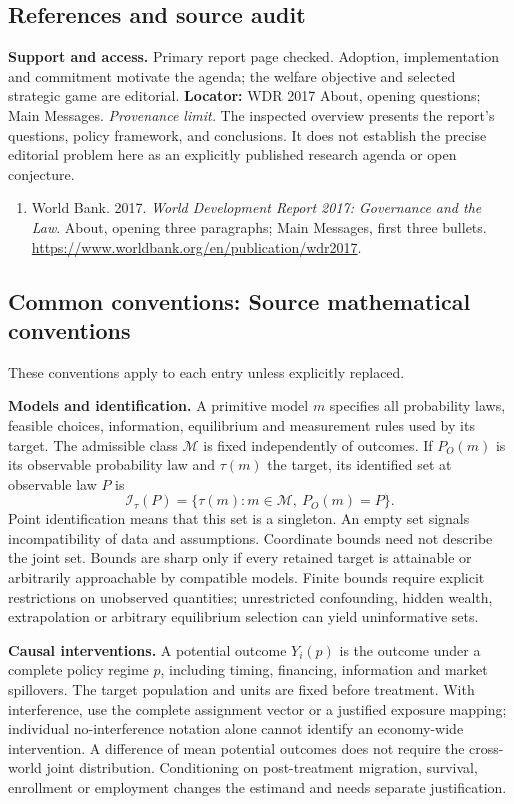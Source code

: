 \documentclass[11pt,a4paper]{article}
\begin{document}
\subsection*{References and source audit}
\textbf{Support and access.} Primary report page checked. Adoption, implementation and commitment motivate the agenda; the welfare objective and selected strategic game are editorial. \textbf{Locator:} WDR 2017 About, opening questions; Main Messages. \emph{Provenance limit.} The inspected overview presents the report's questions, policy framework, and conclusions. It does not establish the precise editorial problem here as an explicitly published research agenda or open conjecture.
\begin{enumerate}\raggedright
\item\hypertarget{definitions:source:30007671:1}{} World Bank. 2017. \emph{World Development Report 2017: Governance and the Law}. About, opening three paragraphs; Main Messages, first three bullets.
\url{https://www.worldbank.org/en/publication/wdr2017}.
\end{enumerate}

\subsection*{Common conventions: Source mathematical conventions}

These conventions apply to each entry unless explicitly replaced.

\textbf{Models and identification.} A primitive model \(m\) specifies all probability laws, feasible choices, information, equilibrium and measurement rules used by its target. The admissible class \(\mathcal M\) is fixed independently of outcomes. If \(P_O(m)\) is its observable probability law and \(\tau(m)\) the target, its identified set at observable law \(P\) is
\[
 \mathcal I_\tau(P)=\{\tau(m):m\in\mathcal M,\ P_O(m)=P\}.
\]
Point identification means that this set is a singleton. An empty set signals incompatibility of data and assumptions. Coordinate bounds need not describe the joint set. Bounds are sharp only if every retained target is attainable or arbitrarily approachable by compatible models. Finite bounds require explicit restrictions on unobserved quantities; unrestricted confounding, hidden wealth, extrapolation or arbitrary equilibrium selection can yield uninformative sets.

\textbf{Causal interventions.} A potential outcome \(Y_i(p)\) is the outcome under a complete policy regime \(p\), including timing, financing, information and market spillovers. The target population and units are fixed before treatment. With interference, use the complete assignment vector or a justified exposure mapping; individual no-interference notation alone cannot identify an economy-wide intervention. A difference of mean potential outcomes does not require the cross-world joint distribution. Conditioning on post-treatment migration, survival, enrollment or employment changes the estimand and needs separate justification.
\end{document}
